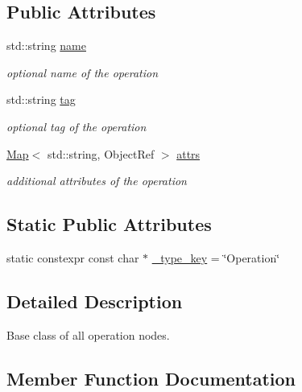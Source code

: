 \subsection*{Public Attributes}
\begin{DoxyCompactItemize}
\item 
std\+::string \hyperlink{classtvm_1_1te_1_1OperationNode_ad2fd6f140257f7b3c311f88374fa74d2}{name}
\begin{DoxyCompactList}\small\item\em optional name of the operation \end{DoxyCompactList}\item 
std\+::string \hyperlink{classtvm_1_1te_1_1OperationNode_ae6ac4336e7dc2df84f128fc97a6cdb9b}{tag}
\begin{DoxyCompactList}\small\item\em optional tag of the operation \end{DoxyCompactList}\item 
\hyperlink{classtvm_1_1Map}{Map}$<$ std\+::string, Object\+Ref $>$ \hyperlink{classtvm_1_1te_1_1OperationNode_a009ebd67a59953ec9a587f9724afd538}{attrs}
\begin{DoxyCompactList}\small\item\em additional attributes of the operation \end{DoxyCompactList}\end{DoxyCompactItemize}
\subsection*{Static Public Attributes}
\begin{DoxyCompactItemize}
\item 
static constexpr const char $\ast$ \hyperlink{classtvm_1_1te_1_1OperationNode_a934232055f50cbd8df33f06f990229c5}{\+\_\+type\+\_\+key} = \char`\"{}Operation\char`\"{}
\end{DoxyCompactItemize}


\subsection{Detailed Description}
Base class of all operation nodes. 

\subsection{Member Function Documentation}
